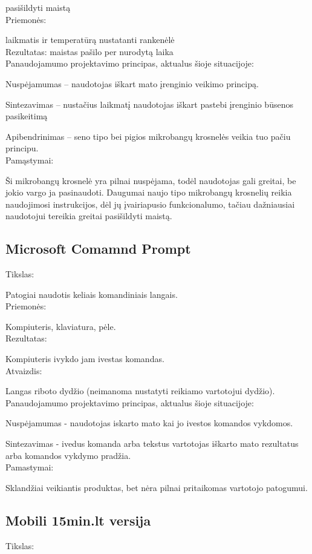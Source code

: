 ﻿\documentclass[a4paper, 12pt]{article}
\begin{document}
		pasišildyti maistą\\ 	
		Priemonės: 
		
		laikmatis ir temperatūrą nustatanti rankenėlė\\ 		
		Rezultatas:
		maistas pašilo per nurodytą laika\\ 	
		Panaudojamumo projektavimo principas, aktualus šioje situacijoje:
		
		Nuspėjamumas – naudotojas iškart mato įrenginio veikimo principą.
			
		Sintezavimas – nustačius laikmatį naudotojas iškart pastebi įrenginio būsenos pasikeitimą
			
		Apibendrinimas – seno tipo bei pigios mikrobangų krosnelės veikia tuo pačiu principu.\\
		Pamąstymai:
			
		Ši mikrobangų krosnelė yra pilnai nuspėjama, todėl naudotojas gali greitai, be jokio vargo ja pasinaudoti. Daugumai naujo tipo mikrobangų krosnelių reikia naudojimosi instrukcijos, dėl jų įvairiapusio funkcionalumo, tačiau dažniausiai naudotojui tereikia greitai pasišildyti maistą.	
	\subsection{Microsoft Comamnd Prompt}
		Tikslas:
		
		Patogiai naudotis keliais komandiniais langais.\\
		Priemonės:
		
		Kompiuteris, klaviatura, pėle.\\
		Rezultatas:
		
		Kompiuteris ivykdo jam ivestas komandas.\\	
		Atvaizdis:
		
		Langas riboto dydžio (neimanoma nustatyti reikiamo vartotojui dydžio).\\	
		Panaudojamumo projektavimo principas, aktualus šioje situacijoje:
		
		Nuspėjamumas - naudotojas iskarto mato kai jo ivestos komandos vykdomos.
		
		Sintezavimas - ivedus komanda arba tekstus vartotojas iškarto mato rezultatus arba komandos vykdymo pradžia.\\		
		Pamastymai:
		
		Sklandžiai veikiantis produktas, bet nėra pilnai pritaikomas vartotojo patogumui.
	\subsection{Mobili 15min.lt versija}	
		Tikslas:
		
\end{document}
